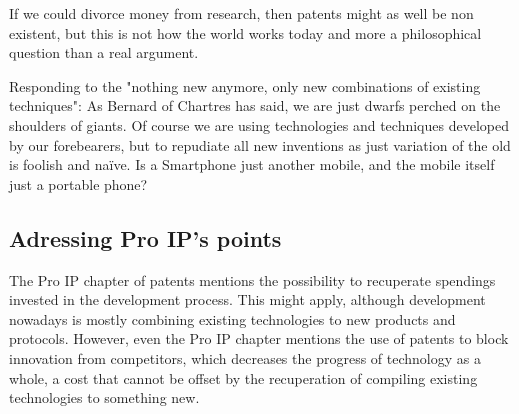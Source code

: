 \documentclass[a4paper]{report}
\begin{document}
If we could divorce money from research, then patents might as well be non existent, but this is not how the world works today and more a philosophical question than a real argument.

Responding to the "nothing new anymore, only new combinations of existing techniques": As Bernard of Chartres has said, we are just dwarfs perched on the shoulders of giants. Of course we are using technologies and techniques developed by our forebearers, but to repudiate all new inventions as just variation of the old is foolish and naïve. Is a Smartphone just another mobile, and the mobile itself just a portable phone?

\subsection{Adressing Pro IP's points}
The Pro IP chapter of patents mentions the possibility to recuperate spendings invested in the development process. This might apply, although development nowadays is mostly combining existing technologies to new products and protocols. However, even the Pro IP chapter mentions the use of patents to block innovation from competitors, which decreases the progress of technology as a whole, a cost that cannot be offset by the recuperation of compiling existing technologies to something new.
\end{document}
